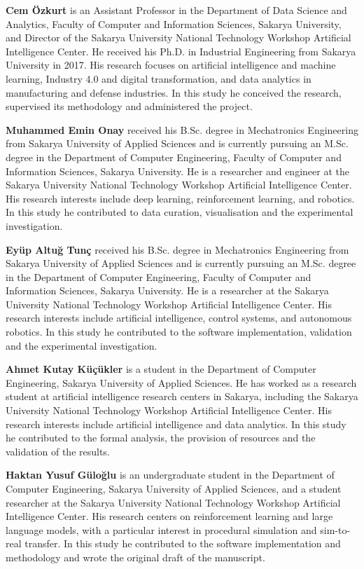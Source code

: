 \textbf{Cem \"Ozkurt} is an Assistant Professor in the Department of Data Science and Analytics, Faculty of Computer and Information Sciences, Sakarya University, and Director of the Sakarya University National Technology Workshop Artificial Intelligence Center. He received his Ph.D. in Industrial Engineering from Sakarya University in 2017. His research focuses on artificial intelligence and machine learning, Industry 4.0 and digital transformation, and data analytics in manufacturing and defense industries. In this study he conceived the research, supervised its methodology and administered the project.

\textbf{Muhammed Emin Onay} received his B.Sc. degree in Mechatronics Engineering from Sakarya University of Applied Sciences and is currently pursuing an M.Sc. degree in the Department of Computer Engineering, Faculty of Computer and Information Sciences, Sakarya University. He is a researcher and engineer at the Sakarya University National Technology Workshop Artificial Intelligence Center. His research interests include deep learning, reinforcement learning, and robotics. In this study he contributed to data curation, visualisation and the experimental investigation.

\textbf{Ey\"up Altu\u{g} Tun\c{c}} received his B.Sc. degree in Mechatronics Engineering from Sakarya University of Applied Sciences and is currently pursuing an M.Sc. degree in the Department of Computer Engineering, Faculty of Computer and Information Sciences, Sakarya University. He is a researcher at the Sakarya University National Technology Workshop Artificial Intelligence Center. His research interests include artificial intelligence, control systems, and autonomous robotics. In this study he contributed to the software implementation, validation and the experimental investigation.

\textbf{Ahmet Kutay K\"u\c{c}\"ukler} is a student in the Department of Computer Engineering, Sakarya University of Applied Sciences. He has worked as a research student at artificial intelligence research centers in Sakarya, including the Sakarya University National Technology Workshop Artificial Intelligence Center. His research interests include artificial intelligence and data analytics. In this study he contributed to the formal analysis, the provision of resources and the validation of the results.

\textbf{Haktan Yusuf G\"ulo\u{g}lu} is an undergraduate student in the Department of Computer Engineering, Sakarya University of Applied Sciences, and a student researcher at the Sakarya University National Technology Workshop Artificial Intelligence Center. His research centers on reinforcement learning and large language models, with a particular interest in procedural simulation and sim-to-real transfer. In this study he contributed to the software implementation and methodology and wrote the original draft of the manuscript.
